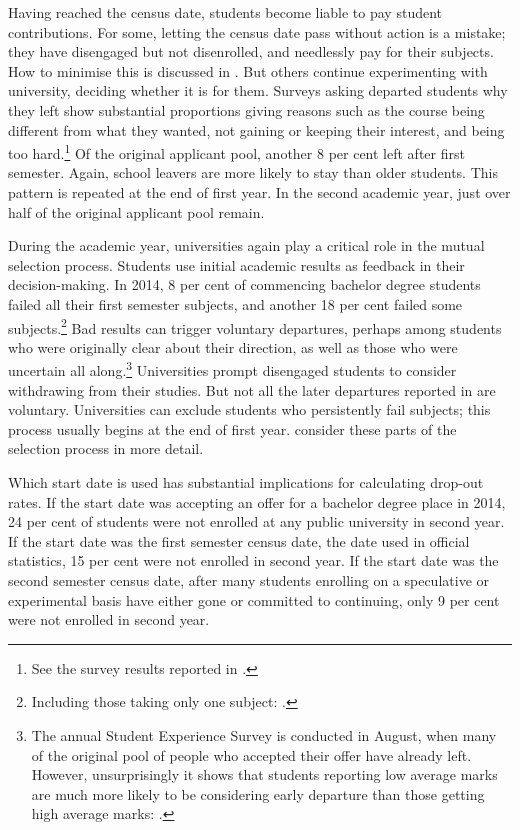 Having reached the census date, students become liable to pay student contributions. For some, letting the census date pass without action is a mistake; they have disengaged but not disenrolled, and needlessly pay for their subjects. How to minimise this is discussed in . But others continue experimenting with university, deciding whether it is for them. Surveys asking departed students why they left show substantial proportions giving reasons such as the course being different from what they wanted, not gaining or keeping their interest, and being too hard.\footnote{See the survey results reported in .} Of the original applicant pool, another 8 per cent left after first semester. Again, school leavers are more likely to stay than older students. This pattern is repeated at the end of first year. In the second academic year, just over half of the original applicant pool remain.

During the academic year, universities again play a critical role in the mutual selection process. Students use initial academic results as feedback in their decision-making. In 2014, 8 per cent of commencing bachelor degree students failed all their first semester subjects, and another 18 per cent failed some subjects.\footnote{Including those taking only one subject: \textcite[][]{DepartmentofEducationandTraininga}.} 
Bad results can trigger voluntary departures, perhaps among students who were originally clear about their direction, as well as those who were uncertain all along.\footnote{The annual Student Experience Survey is conducted in August, when many of the original pool of people who accepted their offer have already left. However, unsurprisingly it shows that students reporting low average marks are much more likely to be considering early departure than those getting high average marks: \textcite[][11]{SocialResearchCentre/DepartmentofEducationandTraining2017}.} 
Universities prompt disengaged students to consider withdrawing from their studies. But not all the later departures reported in  are voluntary. Universities can exclude students who persistently fail subjects; this process usually begins at the end of first year.  consider these parts of the selection process in more detail.

Which start date is used has substantial implications for calculating drop-out rates. If the start date was accepting an offer for a bachelor degree place in 2014, 24 per cent of students were not enrolled at any public university in second year. If the start date was the first semester census date, the date used in official statistics, 15 per cent were not enrolled in second year. If the start date was the second semester census date, after many students enrolling on a speculative or experimental basis have either gone or committed to continuing, only 9 per cent were not enrolled in second year.

